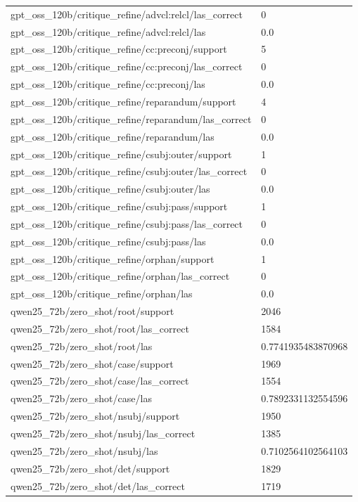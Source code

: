\begin{tabular}{ll}
gpt\_oss\_120b/critique\_refine/advcl:relcl/las\_correct & 0 \\
gpt\_oss\_120b/critique\_refine/advcl:relcl/las & 0.0 \\
gpt\_oss\_120b/critique\_refine/cc:preconj/support & 5 \\
gpt\_oss\_120b/critique\_refine/cc:preconj/las\_correct & 0 \\
gpt\_oss\_120b/critique\_refine/cc:preconj/las & 0.0 \\
gpt\_oss\_120b/critique\_refine/reparandum/support & 4 \\
gpt\_oss\_120b/critique\_refine/reparandum/las\_correct & 0 \\
gpt\_oss\_120b/critique\_refine/reparandum/las & 0.0 \\
gpt\_oss\_120b/critique\_refine/csubj:outer/support & 1 \\
gpt\_oss\_120b/critique\_refine/csubj:outer/las\_correct & 0 \\
gpt\_oss\_120b/critique\_refine/csubj:outer/las & 0.0 \\
gpt\_oss\_120b/critique\_refine/csubj:pass/support & 1 \\
gpt\_oss\_120b/critique\_refine/csubj:pass/las\_correct & 0 \\
gpt\_oss\_120b/critique\_refine/csubj:pass/las & 0.0 \\
gpt\_oss\_120b/critique\_refine/orphan/support & 1 \\
gpt\_oss\_120b/critique\_refine/orphan/las\_correct & 0 \\
gpt\_oss\_120b/critique\_refine/orphan/las & 0.0 \\
qwen25\_72b/zero\_shot/root/support & 2046 \\
qwen25\_72b/zero\_shot/root/las\_correct & 1584 \\
qwen25\_72b/zero\_shot/root/las & 0.7741935483870968 \\
qwen25\_72b/zero\_shot/case/support & 1969 \\
qwen25\_72b/zero\_shot/case/las\_correct & 1554 \\
qwen25\_72b/zero\_shot/case/las & 0.7892331132554596 \\
qwen25\_72b/zero\_shot/nsubj/support & 1950 \\
qwen25\_72b/zero\_shot/nsubj/las\_correct & 1385 \\
qwen25\_72b/zero\_shot/nsubj/las & 0.7102564102564103 \\
qwen25\_72b/zero\_shot/det/support & 1829 \\
qwen25\_72b/zero\_shot/det/las\_correct & 1719 \\

\end{tabular}
